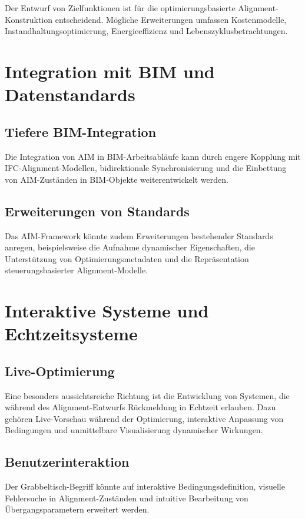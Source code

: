 Der Entwurf von Zielfunktionen ist für die optimierungsbasierte
Alignment-Konstruktion entscheidend. Mögliche Erweiterungen umfassen
Kostenmodelle, Instandhaltungsoptimierung, Energieeffizienz und
Lebenszyklusbetrachtungen.

\section{Integration mit BIM und Datenstandards}

\subsection{Tiefere BIM-Integration}

Die Integration von AIM in BIM-Arbeitsabläufe kann durch engere Kopplung
mit IFC-Alignment-Modellen, bidirektionale Synchronisierung und die
Einbettung von AIM-Zuständen in BIM-Objekte weiterentwickelt werden.

\subsection{Erweiterungen von Standards}

Das AIM-Framework könnte zudem Erweiterungen bestehender Standards
anregen, beispielsweise die Aufnahme dynamischer Eigenschaften, die
Unterstützung von Optimierungsmetadaten und die Repräsentation
steuerungsbasierter Alignment-Modelle.

\section{Interaktive Systeme und Echtzeitsysteme}

\subsection{Live-Optimierung}

Eine besonders aussichtsreiche Richtung ist die Entwicklung von Systemen,
die während des Alignment-Entwurfs Rückmeldung in Echtzeit erlauben.
Dazu gehören Live-Vorschau während der Optimierung, interaktive Anpassung
von Bedingungen und unmittelbare Visualisierung dynamischer Wirkungen.

\subsection{Benutzerinteraktion}

Der Grabbeltisch-Begriff könnte auf interaktive Bedingungsdefinition,
visuelle Fehlersuche in Alignment-Zuständen und intuitive Bearbeitung von
Übergangsparametern erweitert werden.

